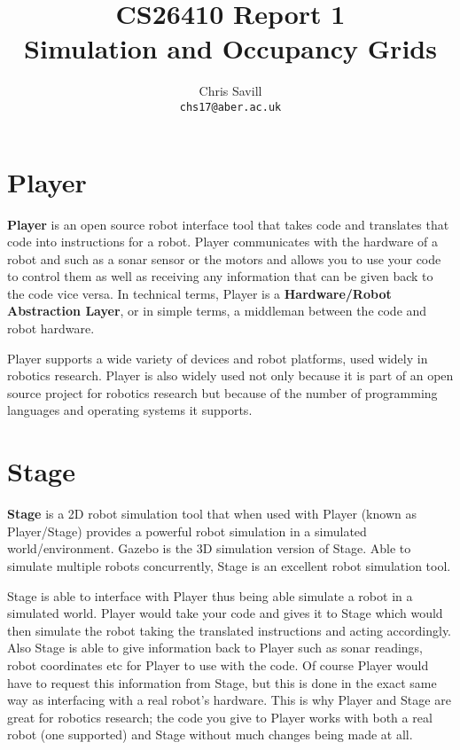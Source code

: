 \documentclass[a4paper,12pt]{article}
\title{CS26410 Report 1\\
Simulation and Occupancy Grids}
\author{Chris Savill\\\texttt{chs17@aber.ac.uk}}
\begin{document}
\maketitle
\newpage
\tableofcontents
\newpage

\section{Player}
\noindent \textbf{Player} is an open source robot interface tool that takes code and translates that code into instructions for a robot. Player communicates with the hardware of a robot and such as a sonar sensor or the motors and allows you to use your code to control them as well as receiving any information that can be given back to the code vice versa. In technical terms, Player is a \textbf{Hardware/Robot Abstraction Layer}, or in simple terms, a middleman between the code and robot hardware.

\vspace{5mm}
\noindent Player supports a wide variety of devices and robot platforms, used widely in robotics research. Player is also widely used not only because it is part of an open source project for robotics research but because of the number of programming languages and operating systems it supports.

\section{Stage}
\textbf{Stage} is a 2D robot simulation tool that when used with Player (known as Player/Stage) provides a powerful robot simulation in a simulated world/environment. Gazebo is the 3D simulation version of Stage. Able to simulate multiple robots concurrently, Stage is an excellent robot simulation tool.

\vspace{5mm}
\noindent Stage is able to interface with Player thus being able simulate a robot in a simulated world. Player would take your code and gives it to Stage which would then simulate the robot taking the translated instructions and acting accordingly. Also Stage is able to give information back to Player such as sonar readings, robot coordinates etc for Player to use with the code. Of course Player would have to request this information from Stage, but this is done in the exact same way as interfacing with a real robot's hardware. This is why Player and Stage are great for robotics research; the code you give to Player works with both a real robot (one supported) and Stage without much changes being made at all.
\end{document}
